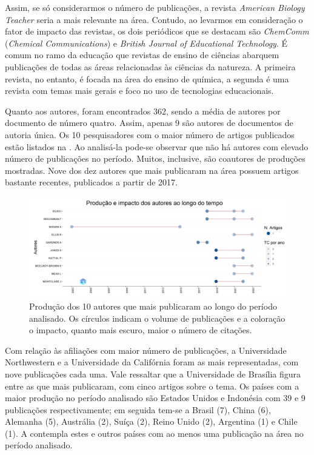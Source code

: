 \documentclass[portuguese]{textolivre}
\begin{document}
Assim, se só considerarmos o número de publicações, a revista \textit{American Biology Teacher} seria a mais relevante na área. Contudo, ao levarmos em consideração o fator de impacto das revistas, os dois periódicos que se destacam são \textit{ChemComm} (\textit{Chemical Communications}) e \textit{British Journal of Educational Technology}. É comum no ramo da educação que revistas de ensino de ciências abarquem publicações de todas as áreas relacionadas às ciências da natureza. A primeira revista, no entanto, é focada na área do ensino de química, a segunda é uma revista com temas mais gerais e foco no uso de tecnologias educacionais.

Quanto aos autores, foram encontrados 362, sendo a média de autores por documento de número quatro. Assim, apenas 9 são autores de documentos de autoria única. Os 10 pesquisadores com o maior número de artigos publicados estão listados na . Ao analisá-la pode-se observar que não há autores com elevado número de publicações no período. Muitos, inclusive, são coautores de produções mostradas. Nove dos dez autores que mais publicaram na área possuem artigos bastante recentes, publicados a partir de 2017.

\begin{figure}[h!]
    \centering
    \includegraphics[width=0.9\linewidth]{Fig3.png}
    \caption{Produção dos 10 autores que mais publicaram ao longo do período analisado. Os círculos indicam o volume de publicações e a coloração o impacto, quanto mais escuro, maior o número de citações.}
    \label{fig3}
\end{figure}

Com relação às afiliações com maior número de publicações, a Universidade Northwestern e a Universidade da Califórnia foram as mais representadas, com nove publicações cada uma. Vale ressaltar que a Universidade de Brasília figura entre as que mais publicaram, com cinco artigos sobre o tema. Os países com a maior produção no período analisado são Estados Unidos e Indonésia com 39 e 9 publicações respectivamente; em seguida tem-se a Brasil (7), China (6), Alemanha (5), Austrália (2), Suíça (2), Reino Unido (2), Argentina (1) e Chile (1). A  contempla estes e outros países com ao menos uma publicação na área no período analisado.
\end{document}
